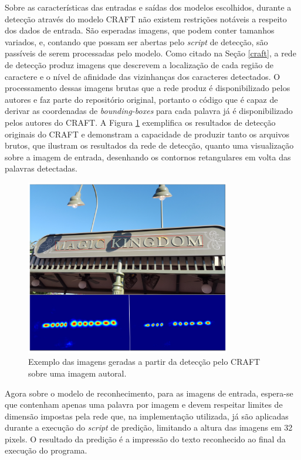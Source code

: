 Sobre as características das entradas e saídas dos modelos escolhidos, durante a detecção através do modelo CRAFT não existem restrições notáveis a respeito dos dados de entrada. São esperadas imagens, que podem conter tamanhos variados, e, contando que possam ser abertas pelo \textit{script} de detecção, são passíveis de serem processadas pelo modelo. Como citado na Seção \ref{craft}, a rede de detecção produz imagens que descrevem a localização de cada região de caractere e o nível de afinidade das vizinhanças dos caracteres detectados. O processamento dessas imagens brutas que a rede produz é disponibilizado pelos autores e faz parte do repositório original, portanto o código que é capaz de derivar as coordenadas de \textit{bounding-boxes} para cada palavra já é disponibilizado pelos autores do CRAFT. A Figura \ref{fig:methodology_craft_example} exemplifica os resultados de detecção originais do CRAFT e demonstram a capacidade de produzir tanto os arquivos brutos, que ilustram os resultados da rede de detecção, quanto uma visualização sobre a imagem de entrada, desenhando os contornos retangulares em volta das palavras detectadas.

\begin{figure}
    \centering
    \includegraphics[width=0.8\textwidth]{figs/craft-exmaple.png}
    \caption{Exemplo das imagens geradas a partir da detecção pelo CRAFT sobre uma imagem autoral.}
    \label{fig:methodology_craft_example}
\end{figure}

Agora sobre o modelo de reconhecimento, para as imagens de entrada, espera-se que contenham apenas uma palavra por imagem e devem respeitar limites de dimensão impostas pela rede que, na implementação utilizada, já são aplicadas durante a execução do \textit{script} de predição, limitando a altura das imagens em 32 pixels. O resultado da predição é a impressão do texto reconhecido ao final da execução do programa. 

